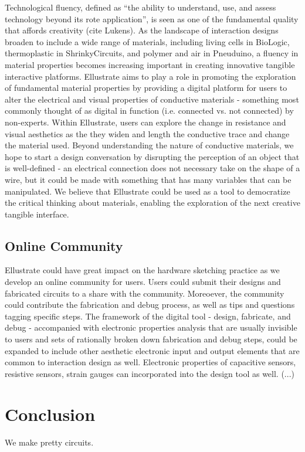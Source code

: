 \documentclass{sigchi}
\begin{document}
Technological fluency, defined as ``the ability to understand, use, and assess technology beyond its rote application'', is seen as one of the fundamental quality that affords creativity (cite Lukens). As the landscape of interaction designs broaden to include a wide range of materials, including living cells in BioLogic, thermoplastic in ShrinkyCircuits, and polymer and air in Pneuduino, a fluency in material properties becomes increasing important in creating innovative tangible interactive platforms. Ellustrate aims to play a role in promoting the exploration of fundamental material properties by providing a digital platform for users to alter the electrical and visual properties of conductive materials - something most commonly thought of as digital in function (i.e. connected vs. not connected) by non-experts. Within Ellustrate, users can explore the change in resistance and visual aesthetics as the they widen and length the conductive trace and change the material used. Beyond understanding the nature of conductive materials, we hope to start a design conversation by disrupting the perception of an object that is well-defined - an electrical connection does not necessary take on the shape of a wire, but it could be made with something that has many variables that can be manipulated. We believe that Ellustrate could be used as a tool to democratize the critical thinking about materials, enabling the exploration of the next creative tangible interface. 


\subsection{Online Community}
Ellustrate could have great impact on the hardware sketching practice as we develop an online community for users. Users could submit their designs and fabricated circuits to a share with the community. Moreoever, the community could contribute the fabrication and debug process, as well as tips and questions tagging specific steps. The framework of the digital tool - design, fabricate, and debug - accompanied with electronic properties analysis that are usually invisible to users and sets of rationally broken down fabrication and debug steps, could be expanded to include other aesthetic electronic input and output elements that are common to interaction design as well. Electronic properties of capacitive sensors, resistive sensors, strain gauges can incorporated into the design tool as well. (...)

\section {Conclusion}
We make pretty circuits. 


\balance



\end{document}
